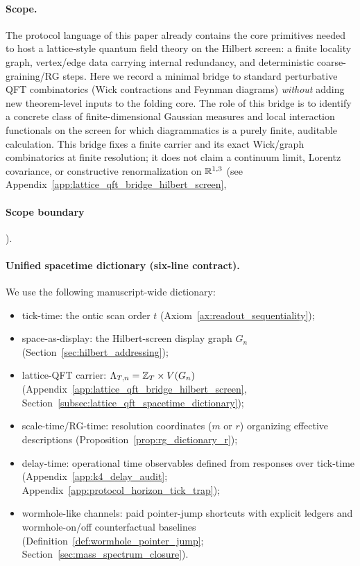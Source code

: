 \paragraph{Scope.}
\InterfaceTag The protocol language of this paper already contains the core primitives needed to host a lattice-style quantum field theory on the Hilbert screen: a finite locality graph, vertex/edge data carrying internal redundancy, and deterministic coarse-graining/RG steps.
Here we record a minimal bridge to standard perturbative QFT combinatorics (Wick contractions and Feynman diagrams) \emph{without} adding new theorem-level inputs to the folding core.
The role of this bridge is to identify a concrete class of finite-dimensional Gaussian measures and local interaction functionals on the screen for which diagrammatics is a purely finite, auditable calculation.
This bridge fixes a finite carrier and its exact Wick/graph combinatorics at finite resolution; it does not claim a continuum limit, Lorentz covariance, or constructive renormalization on $\mathbb{R}^{1,3}$ (see Appendix~\ref{app:lattice_qft_bridge_hilbert_screen}, \paragraph{Scope boundary}).

\paragraph{Unified spacetime dictionary (six-line contract).}
\InterfaceTag We use the following manuscript-wide dictionary:
\begin{itemize}
\item tick-time: the ontic scan order $t$ (Axiom~\ref{ax:readout_sequentiality});
\item space-as-display: the Hilbert-screen display graph $G_n$ (Section~\ref{sec:hilbert_addressing});
\item lattice-QFT carrier: $\Lambda_{T,n}=\mathbb{Z}_T\times V(G_n)$ (Appendix~\ref{app:lattice_qft_bridge_hilbert_screen}, Section~\ref{subsec:lattice_qft_spacetime_dictionary});
\item scale-time/RG-time: resolution coordinates ($m$ or $r$) organizing effective descriptions (Proposition~\ref{prop:rg_dictionary_r});
\item delay-time: operational time observables defined from responses over tick-time (Appendix~\ref{app:k4_delay_audit}; Appendix~\ref{app:protocol_horizon_tick_trap});
\item wormhole-like channels: paid pointer-jump shortcuts with explicit ledgers and wormhole-on/off counterfactual baselines (Definition~\ref{def:wormhole_pointer_jump}; Section~\ref{sec:mass_spectrum_closure}).
\end{itemize}

